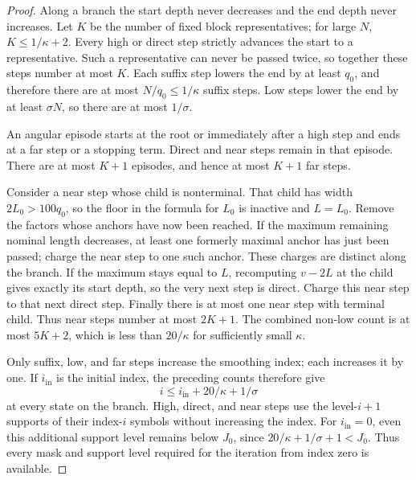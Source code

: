 \begin{proof}
Along a branch the start depth never decreases and the end depth
never increases.  Let \(K\) be the number of fixed block
representatives; for large \(N\), \(K\le1/\kappa+2\).
Every high or direct step strictly advances the start to a
representative.  Such a representative can never be passed twice,
so together these steps number at most \(K\).  Each suffix step
lowers the end by at least \(q_0\), and therefore there are at most
\(N/q_0\le1/\kappa\) suffix steps.  Low steps lower the end by
at least \(\sigma N\), so there are at most \(1/\sigma\).

An angular episode starts at the root or immediately after a high
step and ends at a far step or a stopping term.  Direct and near
steps remain in that episode.  There are at most \(K+1\) episodes,
and hence at most \(K+1\) far steps.

Consider a near step whose child is nonterminal.  That child has
width \(2L_0>100q_0\), so the floor in the formula for \(L_0\)
is inactive and \(L=L_0\).  Remove the factors whose anchors have
now been reached.  If the maximum remaining nominal length
decreases, at least one formerly maximal anchor has just been
passed; charge the near step to one such anchor.  These charges
are distinct along the branch.  If the maximum stays equal to
\(L\), recomputing \(v-2L\) at the child gives exactly its start
depth, so the very next step is direct.  Charge this near step to
that next direct step.  Finally there is at most one near step
with terminal child.  Thus near steps number at most \(2K+1\).
The combined non-low count is at most \(5K+2\), which is less
than \(20/\kappa\) for sufficiently small \(\kappa\).

Only suffix, low, and far steps increase the smoothing index;
each increases it by one.  If \(i_{\mathrm{in}}\) is the initial
index, the preceding counts therefore give
\[
 i\le i_{\mathrm{in}}+20/\kappa+1/\sigma
\]
at every state on the branch.  High, direct, and near steps use the
level-\(i+1\) supports of their index-\(i\) symbols without increasing
the index.  For \(i_{\mathrm{in}}=0\), even this additional support
level remains below \(J_0\), since
\(20/\kappa+1/\sigma+1<J_0\).  Thus every mask and support level
required for the iteration from index zero is available.
\end{proof}

